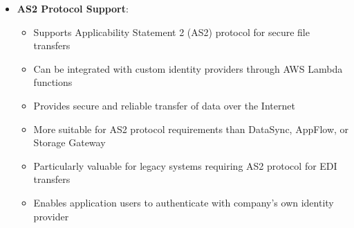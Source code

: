 \documentclass[11pt,a4paper]{report}
\begin{document}
\begin{itemize}
  \item \textbf{AS2 Protocol Support}:
\begin{itemize}
  \item Supports Applicability Statement 2 (AS2) protocol for secure file transfers
  \item Can be integrated with custom identity providers through AWS Lambda functions
  \item Provides secure and reliable transfer of data over the Internet
  \item More suitable for AS2 protocol requirements than DataSync, AppFlow, or Storage Gateway
  \item Particularly valuable for legacy systems requiring AS2 protocol for EDI transfers
  \item Enables application users to authenticate with company's own identity provider
\end{itemize}
\end{itemize}
\end{document}
